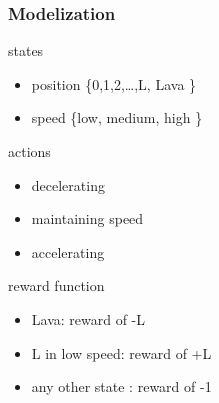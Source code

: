 \documentclass[dvipsnames,svgnames]{beamer}
\begin{document}
\begin{frame}
\frametitle{Modelization}
\begin{block}{states}
\begin{itemize}
\item  position \{0,1,2,\ldots ,L, Lava  \}
\item  speed    \{low, medium, high   \}
\end{itemize}
\end{block}
\pause
\begin{block}{actions}
\begin{itemize}
\item  decelerating 
\item  maintaining speed
\item  accelerating 
\end{itemize}
\end{block}
\pause
\begin{block}{reward function}
\begin{itemize}
\item Lava: reward of -L
\item L in low speed: reward of +L
\item any other state : reward of -1
\end{itemize}
\end{block}

\end{frame}
\end{document}

